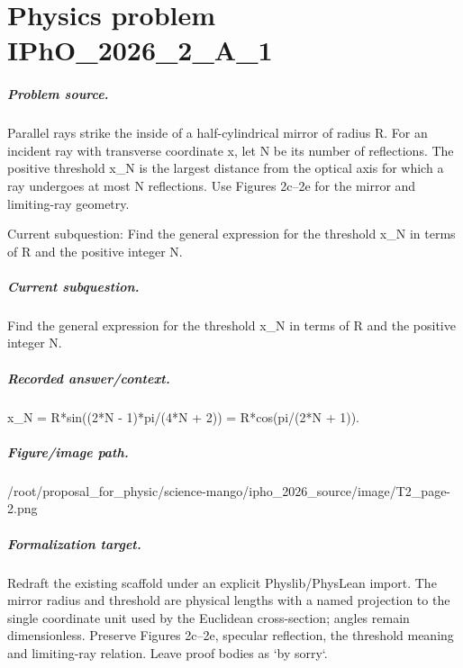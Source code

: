 
\chapter{Physics problem IPhO\_2026\_2\_A\_1}
\label{ch:IPhO2026Problems_problem_IPhO_2026_2_A_1}

\paragraph{Problem source.}
Parallel rays strike the inside of a half-cylindrical mirror of radius R.  For
an incident ray with transverse coordinate x, let N be its number of
reflections.  The positive threshold x\_N is the largest distance from the
optical axis for which a ray undergoes at most N reflections.  Use Figures
2c--2e for the mirror and limiting-ray geometry.

Current subquestion:
Find the general expression for the threshold x\_N in terms of R and the positive integer N.

\paragraph{Current subquestion.}
Find the general expression for the threshold x\_N in terms of R and the positive integer N.

\paragraph{Recorded answer/context.}
x\_N = R*sin((2*N - 1)*pi/(4*N + 2)) = R*cos(pi/(2*N + 1)).

\paragraph{Figure/image path.}
/root/proposal\_for\_physic/science-mango/ipho\_2026\_source/image/T2\_page-2.png

\paragraph{Formalization target.}
Redraft the existing scaffold under an explicit Physlib/PhysLean import.  The
mirror radius and threshold are physical lengths with a named projection to the
single coordinate unit used by the Euclidean cross-section; angles remain
dimensionless.  Preserve Figures 2c--2e, specular reflection, the threshold
meaning and limiting-ray relation.  Leave proof bodies as `by sorry`.

